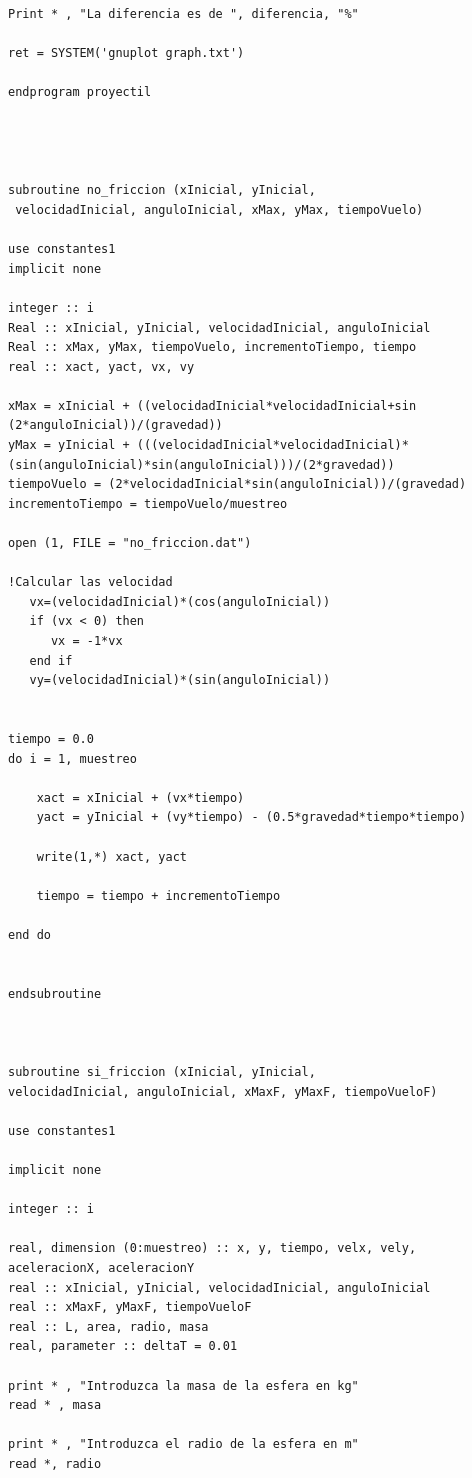 \documentclass[10pt]{article}
\begin{document}
\begin{verbatim}
Print * , "La diferencia es de ", diferencia, "%"

ret = SYSTEM('gnuplot graph.txt')

endprogram proyectil




subroutine no_friccion (xInicial, yInicial,
 velocidadInicial, anguloInicial, xMax, yMax, tiempoVuelo)

use constantes1
implicit none

integer :: i
Real :: xInicial, yInicial, velocidadInicial, anguloInicial
Real :: xMax, yMax, tiempoVuelo, incrementoTiempo, tiempo
real :: xact, yact, vx, vy

xMax = xInicial + ((velocidadInicial*velocidadInicial+sin
(2*anguloInicial))/(gravedad))
yMax = yInicial + (((velocidadInicial*velocidadInicial)*
(sin(anguloInicial)*sin(anguloInicial)))/(2*gravedad))
tiempoVuelo = (2*velocidadInicial*sin(anguloInicial))/(gravedad)
incrementoTiempo = tiempoVuelo/muestreo

open (1, FILE = "no_friccion.dat")

!Calcular las velocidad
   vx=(velocidadInicial)*(cos(anguloInicial))
   if (vx < 0) then
      vx = -1*vx
   end if
   vy=(velocidadInicial)*(sin(anguloInicial))


tiempo = 0.0
do i = 1, muestreo

    xact = xInicial + (vx*tiempo)
    yact = yInicial + (vy*tiempo) - (0.5*gravedad*tiempo*tiempo)

    write(1,*) xact, yact
	
    tiempo = tiempo + incrementoTiempo

end do


endsubroutine



subroutine si_friccion (xInicial, yInicial, 
velocidadInicial, anguloInicial, xMaxF, yMaxF, tiempoVueloF)

use constantes1

implicit none 

integer :: i 

real, dimension (0:muestreo) :: x, y, tiempo, velx, vely, aceleracionX, aceleracionY
real :: xInicial, yInicial, velocidadInicial, anguloInicial
real :: xMaxF, yMaxF, tiempoVueloF
real :: L, area, radio, masa
real, parameter :: deltaT = 0.01

print * , "Introduzca la masa de la esfera en kg"
read * , masa

print * , "Introduzca el radio de la esfera en m"
read *, radio


\end{verbatim}
\end{document}
